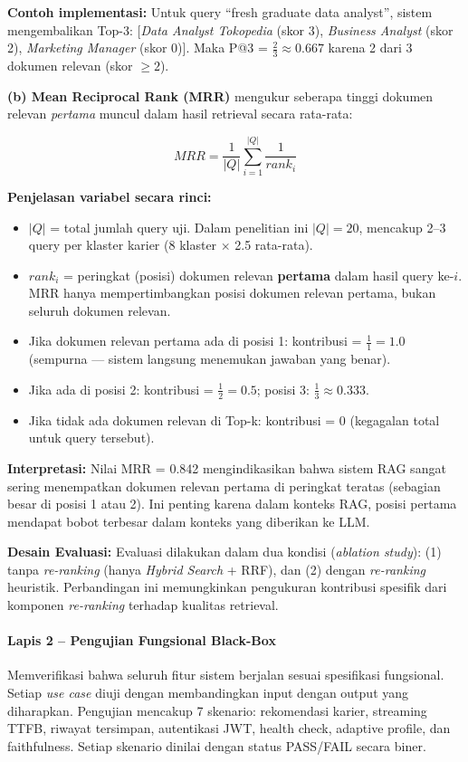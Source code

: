 \textbf{Contoh implementasi:} Untuk query ``fresh graduate data analyst'', sistem
mengembalikan Top-3: [\textit{Data Analyst Tokopedia} (skor 3), \textit{Business Analyst}
(skor 2), \textit{Marketing Manager} (skor 0)]. Maka P@3 = $\frac{2}{3} \approx 0.667$
karena 2 dari 3 dokumen relevan (skor $\geq 2$).

\textbf{(b) Mean Reciprocal Rank (MRR)} mengukur seberapa tinggi dokumen relevan
\textit{pertama} muncul dalam hasil retrieval secara rata-rata:

\begin{equation}
  MRR = \frac{1}{|Q|} \sum_{i=1}^{|Q|} \frac{1}{rank_i}
  \label{eq:mrr}
\end{equation}

\noindent \textbf{Penjelasan variabel secara rinci:}
\begin{itemize}
  \item $|Q|$ = total jumlah query uji. Dalam penelitian ini $|Q| = 20$,
    mencakup 2--3 query per klaster karier (8 klaster $\times$ 2.5 rata-rata).
  \item $rank_i$ = peringkat (posisi) dokumen relevan \textbf{pertama} dalam
    hasil query ke-$i$. MRR hanya mempertimbangkan posisi dokumen relevan pertama,
    bukan seluruh dokumen relevan.
  \item Jika dokumen relevan pertama ada di posisi 1: kontribusi = $\frac{1}{1} = 1.0$
    (sempurna --- sistem langsung menemukan jawaban yang benar).
  \item Jika ada di posisi 2: kontribusi = $\frac{1}{2} = 0.5$; posisi 3:
    $\frac{1}{3} \approx 0.333$.
  \item Jika tidak ada dokumen relevan di Top-k: kontribusi = 0
    (kegagalan total untuk query tersebut).
\end{itemize}

\textbf{Interpretasi:} Nilai MRR = 0.842 mengindikasikan bahwa sistem RAG sangat sering
menempatkan dokumen relevan pertama di peringkat teratas (sebagian besar di posisi 1 atau 2).
Ini penting karena dalam konteks RAG, posisi pertama mendapat bobot
terbesar dalam konteks yang diberikan ke LLM.

\textbf{Desain Evaluasi:} Evaluasi dilakukan dalam dua kondisi (\textit{ablation study}):
(1) tanpa \textit{re-ranking} (hanya \textit{Hybrid Search} + RRF), dan
(2) dengan \textit{re-ranking} heuristik. Perbandingan ini memungkinkan pengukuran
kontribusi spesifik dari komponen \textit{re-ranking} terhadap kualitas retrieval.

\paragraph{Lapis 2 -- Pengujian Fungsional Black-Box}
Memverifikasi bahwa seluruh fitur sistem berjalan sesuai spesifikasi fungsional.
Setiap \textit{use case} diuji dengan membandingkan input dengan output yang diharapkan.
Pengujian mencakup 7 skenario: rekomendasi karier, streaming TTFB, riwayat tersimpan,
autentikasi JWT, health check, adaptive profile, dan faithfulness. Setiap skenario
dinilai dengan status PASS/FAIL secara biner.


